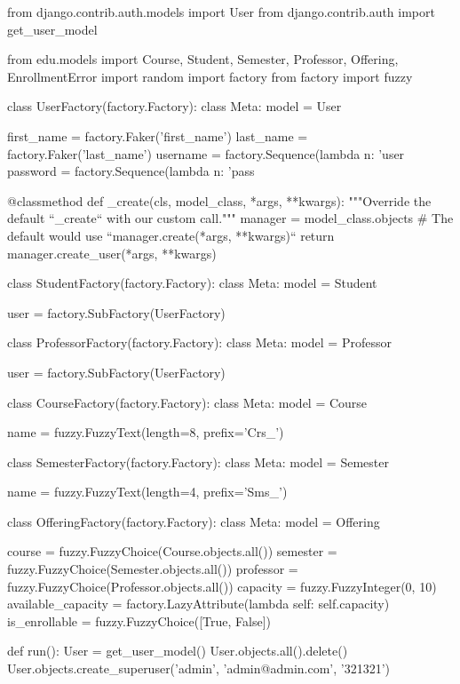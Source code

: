 
\begin{simplecode}
from django.contrib.auth.models import User
from django.contrib.auth import get_user_model

from edu.models import Course, Student, Semester, Professor, Offering, EnrollmentError
import random
import factory
from factory import fuzzy

class UserFactory(factory.Factory):
    class Meta:
        model = User

    first_name = factory.Faker('first_name')
    last_name = factory.Faker('last_name')
    username = factory.Sequence(lambda n: 'user%
    password = factory.Sequence(lambda n: 'pass%

    @classmethod
    def _create(cls, model_class, *args, **kwargs):
        """Override the default ``_create`` with our custom call."""
        manager = model_class.objects
        # The default would use ``manager.create(*args, **kwargs)``
        return manager.create_user(*args, **kwargs)


class StudentFactory(factory.Factory):
    class Meta:
        model = Student

    user = factory.SubFactory(UserFactory)


class ProfessorFactory(factory.Factory):
    class Meta:
        model = Professor

    user = factory.SubFactory(UserFactory)


class CourseFactory(factory.Factory):
    class Meta:
        model = Course

    name = fuzzy.FuzzyText(length=8, prefix='Crs_')


class SemesterFactory(factory.Factory):
    class Meta:
        model = Semester

    name = fuzzy.FuzzyText(length=4, prefix='Sms_')


class OfferingFactory(factory.Factory):
    class Meta:
        model = Offering

    course = fuzzy.FuzzyChoice(Course.objects.all())
    semester = fuzzy.FuzzyChoice(Semester.objects.all())
    professor = fuzzy.FuzzyChoice(Professor.objects.all())
    capacity = fuzzy.FuzzyInteger(0, 10)
    available_capacity = factory.LazyAttribute(lambda self: self.capacity)
    is_enrollable = fuzzy.FuzzyChoice([True, False])

def run():
    User = get_user_model()
    User.objects.all().delete()
    User.objects.create_superuser('admin', 'admin@admin.com', '321321')


\end{simplecode}
